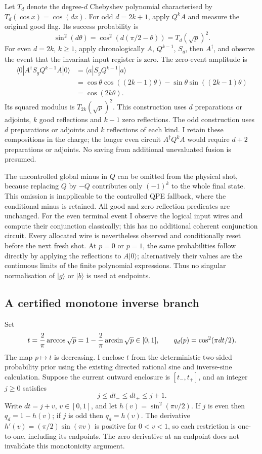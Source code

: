 \documentclass[11pt]{article}
\begin{document}
Let $T_d$ denote the degree-$d$ Chebyshev polynomial characterised by
$T_d(\cos x)=\cos(dx)$. For odd $d=2k+1$, apply $Q^kA$ and measure
the original good flag. Its success probability is
\[
 \sin^2(d\theta)
 =\cos^2(d(\pi/2-\theta))=T_d(\sqrt p)^2.
\]
For even $d=2k$, $k\geq1$, apply chronologically $A$, $Q^{k-1}$,
$S_g$, then $A^\dagger$, and observe the event that the invariant input
register is zero. The zero-event amplitude is
\begin{align*}
 \langle0|A^\dagger S_gQ^{k-1}A|0\rangle
 &=\langle a|S_gQ^{k-1}|a\rangle\\
 &=\cos\theta\cos((2k-1)\theta)
   -\sin\theta\sin((2k-1)\theta)\\
 &=\cos(2k\theta).
\end{align*}
Its squared modulus is $T_{2k}(\sqrt p)^2$. This construction uses
$d$ preparations or adjoints, $k$ good reflections and $k-1$ zero
reflections. The odd construction uses $d$ preparations or adjoints and
$k$ reflections of each kind. I retain these compositions in the charge;
the longer even circuit $A^\dagger Q^kA$ would require $d+2$ preparations
or adjoints. No saving from additional unevaluated fusion is presumed.

The uncontrolled global minus in $Q$ can be omitted from the physical
shot, because replacing $Q$ by $-Q$ contributes only $(-1)^k$ to the
whole final state. This omission is inapplicable to the controlled QPE
fallback, where the conditional minus is retained. All good and zero
reflection predicates are unchanged. For the even terminal event I
observe the logical input wires and compute their conjunction classically;
this has no additional coherent conjunction circuit. Every allocated
wire is nevertheless observed and conditionally reset before the next
fresh shot. At $p=0$ or $p=1$, the same probabilities follow directly by
applying the reflections to $A|0\rangle$; alternatively their values are
the continuous limits of the finite polynomial expressions. Thus no
singular normalisation of $|g\rangle$ or $|b\rangle$ is used at endpoints.

\subsection{A certified monotone inverse branch}

Set
\[
 t={2\over\pi}\arccos\sqrt p
 =1-{2\over\pi}\arcsin\sqrt p\in[0,1],
 \qquad q_d(p)=\cos^2(\pi dt/2).
\]
The map $p\mapsto t$ is decreasing. I enclose $t$ from the deterministic
two-sided probability prior using the existing directed rational sine
and inverse-sine calculation. Suppose the current outward enclosure is
$[t_-,t_+]$, and an integer $j\geq0$ satisfies
\[
 j\leq dt_-\leq dt_+\leq j+1.
 \tag{C1}\label{eq:cheb-monotone-branch}
\]
Write $dt=j+v$, $v\in[0,1]$, and let
$h(v)=\sin^2(\pi v/2)$. If $j$ is even then
$q_d=1-h(v)$; if $j$ is odd then $q_d=h(v)$. The derivative
$h'(v)=(\pi/2)\sin(\pi v)$ is positive for $0<v<1$, so each
restriction is one-to-one, including its endpoints. The zero derivative
at an endpoint does not invalidate this monotonicity argument.
\end{document}
